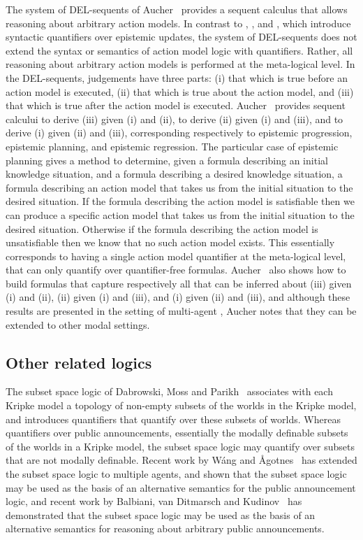 The system of DEL-sequents of Aucher~\cite{aucher:2011,aucher:2012} provides a sequent calculus that allows reasoning about arbitrary action models.
In contrast to \logicApal{}, \logicGal{}, and \logicCal{}, which introduce syntactic quantifiers over epistemic updates, the system of DEL-sequents does not extend the syntax or semantics of action model logic with quantifiers.
Rather, all reasoning about arbitrary action models is performed at the meta-logical level.
In the DEL-sequents, judgements have three parts: (i) that which is true before an action model is executed, (ii) that which is true about the action model, and (iii) that which is true after the action model is executed.
Aucher~\cite{aucher:2011,aucher:2012} provides sequent calcului to derive (iii) given (i) and (ii), to derive (ii) given (i) and (iii), and to derive (i) given (ii) and (iii), corresponding respectively to epistemic progression, epistemic planning, and epistemic regression.
The particular case of epistemic planning gives a method to determine, given a formula describing an initial knowledge situation, and a formula describing a desired knowledge situation, a formula describing an action model that takes us from the initial situation to the desired situation.
If the formula describing the action model is satisfiable then we can produce a specific action model that takes us from the initial situation to the desired situation.
Otherwise if the formula describing the action model is unsatisfiable then we know that no such action model exists.
This essentially corresponds to having a single action model quantifier at the meta-logical level, that can only quantify over quantifier-free formulas.
Aucher~\cite{aucher:2011,aucher:2012} also shows how to build formulas that capture respectively all that can be inferred about (iii) given (i) and (ii), (ii) given (i) and (iii), and (i) given (ii) and (iii), and although these results are presented in the setting of multi-agent \classK{}, Aucher notes that they can be extended to other modal settings.

\subsection{Other related logics}

The subset space logic of Dabrowski, Moss and Parikh~\cite{dabrowski:1996} associates with each Kripke model a topology of non-empty subsets of the worlds in the Kripke model, and introduces quantifiers that quantify over these subsets of worlds.
Whereas \logicApal{} quantifiers over public announcements, essentially the modally definable subsets of the worlds in a Kripke model, the subset space logic may quantify over subsets that are not modally definable.
Recent work by W{\'a}ng and {\AA}gotnes~\cite{wang:2013a,wang:2013b} has extended the subset space logic to multiple agents, and shown that the subset space logic may be used as the basis of an alternative semantics for the public announcement logic, and recent work by Balbiani, van Ditmarsch and Kudinov~\cite{balbiani:2013} has demonstrated that the subset space logic may be used as the basis of an alternative semantics for reasoning about arbitrary public announcements.

